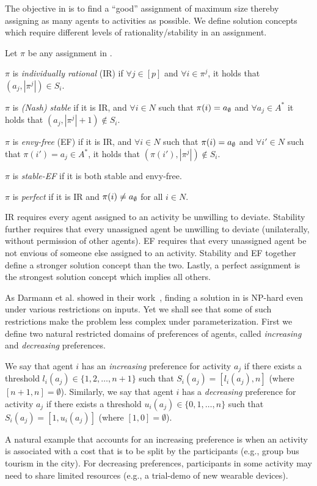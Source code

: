 The objective in \GASPs is to find a ``good'' assignment of maximum size thereby assigning as many agents to activities as possible. We define solution concepts which require different levels of rationality/stability in an assignment.

\begin{definition}
	Let $\pi$ be any assignment in \GASP.

	$\pi$ is {\em individually rational} (IR) if $\forall j \in [p]$ and $\forall i \in \pi^j$, it holds that $(a_j, |\pi^j|) \in S_i$.
	
$\pi$ is {\em (Nash) stable} if it is IR, and $\forall i \in N$ such that $\pi(i) = a_{\emptyset}$ and $\forall a_j \in A^*$ it holds that $(a_j, |\pi^j| + 1) \not\in S_i$. 

$\pi$ is {\em envy-free} (EF) if it is IR, and $\forall i \in N$ such that $\pi(i) = a_{\emptyset}$ and $\forall i' \in N$ such that $\pi(i') = a_j\in A^*$, it holds that $(\pi(i'), |\pi^j|) \not\in S_i$.

$\pi$ is {\em stable-EF} if it is both stable and envy-free.

$\pi$ is {\em perfect} if it is IR and $\pi(i) \neq a_{\emptyset}$ for all $i\in N$.
\end{definition}
IR requires every agent assigned to an activity be unwilling to deviate.
Stability further requires that every unassigned agent be unwilling to deviate (unilaterally, without permission of other agents).
EF requires that every unassigned agent be not envious of someone else assigned to an activity.
Stability and EF together define a stronger solution concept than the two.
Lastly, a perfect assignment is the strongest solution concept which implies all others.


As Darmann et al. showed in their work~\cite{GASP12WINE}, finding a solution in \GASPs is NP-hard even under various restrictions on inputs. Yet we shall see that some of such restrictions make the problem less complex under parameterization. First we define two natural restricted domains of preferences of agents, called {\em increasing} and {\em decreasing} preferences. 
\begin{definition}
	We say that agent $i$ has an {\em increasing} preference for activity $a_j$ if there exists a threshold $l_i(a_j) \in \{1, 2, \dots, n+1\}$ such that $S_i(a_j) = [l_i(a_j), n]$ (where $[n+1,n] = \emptyset$).
	Similarly, we say that agent $i$ has a {\em decreasing} preference for activity $a_j$ if there exists a threshold $u_i(a_j) \in \{0, 1, \dots, n\}$ such that $S_i(a_j) = [1, u_i(a_j)]$ (where $[1,0] = \emptyset$).
\end{definition}
A natural example that accounts for an increasing preference is when an activity is associated with a cost that is to be split by the participants (e.g., group bus tourism in the city). For decreasing preferences, participants in some activity may need to share limited resources (e.g., a trial-demo of new wearable devices).  

